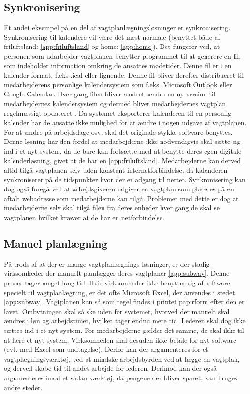 \subsection{Synkronisering}
Et andet eksempel på en del af vagtplanlægningsløsninger er synkronisering. Synkronisering til kalendere vil være det mest normale (benyttet både af friluftsland: \ref{app:friluftsland} og home: \ref{app:home}). Det fungerer ved, at personen som udarbejder vagtplanen benytter programmet til at generere en fil, som indeholder information omkring de ansattes mødetider. Denne fil er i en kalender format, f.eks .ical eller lignende. Denne fil bliver derefter distribueret til medarbejderens personlige kalendersystem som f.eks. Microsoft Outlook eller Google Calendar. Hver gang filen bliver ændret sendes en ny version til medarbejdernes kalendersystem og dermed bliver medarbejdernes vagtplan regelmæssigt opdateret \citep{stage2005}. Da systemet eksporterer kalenderen til en personlig kalender har de ansatte ikke mulighed for at ændre i nogen udgave af vagtplanen. For at ændre på arbejdsdage osv. skal det originale stykke software benyttes. Denne løsning har den fordel at medarbejderne ikke nødvendigvis skal sætte sig ind i et nyt system, da de bare kan fortsætte med at benytte deres egen digitale kalenderløsning, givet at de har en \ref{app:friluftsland}. Medarbejderne kan derved altid tilgå vagtplanen selv uden konstant internetforbindelse, da kalenderen synkroniserer på de tidspunkter hvor der er adgang til nettet. Synkronisering kan dog også foregå ved at arbejdsgiveren udgiver en vagtplan som placeres på en aftalt webadresse som medarbejderne kan tilgå. Problemet med dette er dog at medarbejderne selv skal tilgå filen fra deres enheder hver gang de skal se vagtplanen hvilket kræver at de har en netforbindelse.\\

\subsection{Manuel planlægning}
På trods af at der er mange vagtplanlægnings løsninger, er der stadig virksomheder der manuelt planlægger deres vagtplaner \ref{app:subway}. Denne proces tager meget lang tid. Hvis virksomheder ikke benytter sig af software specielt til vagtplanlægning, er det ofte Microsoft Excel, der anvendes i stedet \ref{app:subway}. Vagtplanen kan så som regel findes i printet papirform efter den er lavet. Ombytningen skal så ske uden for systemet, hvorved der manuelt skal ændres i løn og arbejdstimer, hvilket tager endnu mere tid. Lederen skal dog ikke sættes ind i et nyt system. For medarbejderne gælder det samme, de skal ikke til at lære et nyt system. Virksomheden skal desuden ikke betale for nyt software (evt. med Excel som undtagelse). Derfor kan der argumenteres for et vagtplægningsværktøj, ved at mindske arbejdsbyrden ved at lægge en vagtplan, og derved skabe tid til andet arbejde for lederen. Derimod kan der også argumenteres imod et sådan værktøj, da pengene der bliver sparet, kan bruges andre steder.

